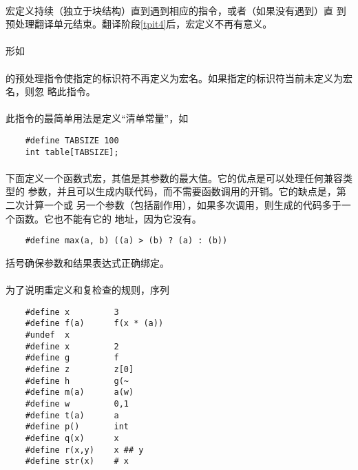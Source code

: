{
\paragraph{}
宏定义持续（独立于块结构）直到遇到相应的指令，或者（如果没有遇到）直
到预处理翻译单元结束。翻译阶段\ref{tpit4}后，宏定义不再有意义。

\paragraph{}
形如                                                                          \\
\mbox{\hspace{4em} }                     \\
的预处理指令使指定的标识符不再定义为宏名。如果指定的标识符当前未定义为宏名，则忽
略此指令。

\paragraph{}
\ex 此指令的最简单用法是定义``清单常量''，如
\begin{lstlisting}
    #define TABSIZE 100
    int table[TABSIZE];
\end{lstlisting}

\paragraph{}
\ex 下面定义一个函数式宏，其值是其参数的最大值。它的优点是可以处理任何兼容类型的
参数，并且可以生成内联代码，而不需要函数调用的开销。它的缺点是，第二次计算一个或
另一个参数（包括副作用），如果多次调用，则生成的代码多于一个函数。它也不能有它的
地址，因为它没有。
\begin{lstlisting}
    #define max(a, b) ((a) > (b) ? (a) : (b))
\end{lstlisting}
括号确保参数和结果表达式正确绑定。

\paragraph{}
\ex 为了说明重定义和复检查的规则，序列
\begin{lstlisting}
    #define x         3
    #define f(a)      f(x * (a))
    #undef  x
    #define x         2
    #define g         f
    #define z         z[0]
    #define h         g(~
    #define m(a)      a(w)
    #define w         0,1
    #define t(a)      a
    #define p()       int
    #define q(x)      x
    #define r(x,y)    x ## y
    #define str(x)    # x


\end{lstlisting}}
